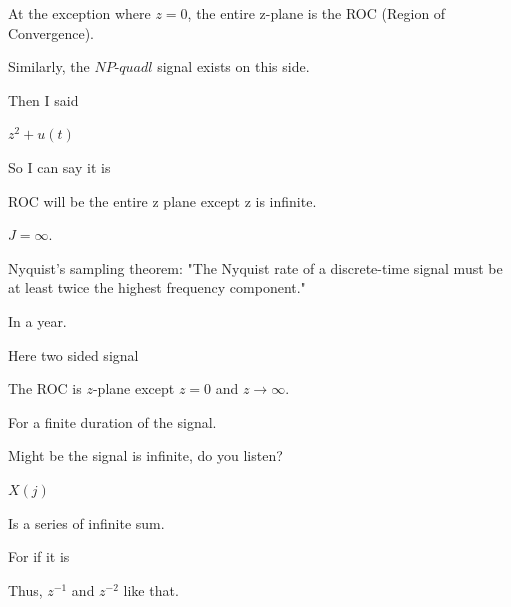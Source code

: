 \documentclass{article}
\begin{document}
At the exception where $z = 0$, the entire z-plane is the ROC (Region of Convergence).







Similarly, the $NP\text{-}quadl$ signal exists on this side.



Then I said

$z^2 + u(t)$

So I can say it is

ROC will be the entire z plane except z is infinite.

$J = \infty$.

Nyquist's sampling theorem: "The Nyquist rate of a discrete-time signal must be at least twice the highest frequency component."

In a year.

Here two sided signal

The ROC is $z$-plane except $z = 0$ and $z \to \infty$.

For a finite duration of the signal.

Might be the signal is infinite, do you listen?









$X(j)$

Is a series of infinite sum.













For if it is

Thus, $z^{-1}$ and $z^{-2}$ like that.



\end{document}
